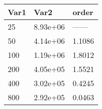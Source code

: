 \begin{tabular}{lll}
Var1 & Var2 & order \\ 
\hline 
25 & 8.93e+06 & ------ \\ 
50 & 4.14e+06 & 1.1086 \\ 
100 & 1.19e+06 & 1.8012 \\ 
200 & 4.05e+05 & 1.5521 \\ 
400 & 3.02e+05 & 0.4245 \\ 
800 & 2.92e+05 & 0.0463 \\ 
\hline 
\end{tabular}